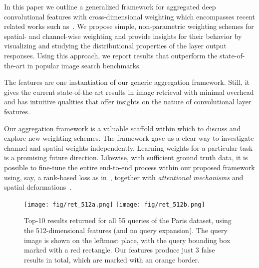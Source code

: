 \documentclass[runningheads]{llncs}
\begin{document}
In this paper we outline a generalized framework for aggregated deep convolutional features with cross-dimensional weighting which encompasses recent related works such as~\cite{BaLe15}. We propose simple, non-parametric weighting schemes for spatial- and channel-wise weighting and provide insights for their behavior by visualizing and studying the distributional properties of the layer output responses. Using this approach, we report results that outperform the state-of-the-art in popular image search benchmarks. 

The \Crow features are one instantiation of our generic aggregation framework. Still, it gives the current state-of-the-art results in image retrieval with minimal overhead and has intuitive qualities that offer insights on the nature of convolutional layer features.

Our aggregation framework is a valuable scaffold within which to discuss and explore new weighting schemes. The framework gave us a clear way to investigate channel and spatial weights independently. Learning weights for a particular task is a promising future direction. Likewise, with sufficient ground truth data, it is possible to fine-tune the entire end-to-end process within our proposed framework using, say, a rank-based loss as in~\cite{RaTC16, GARL16}, together with \textit{attentional mechanisms} and spatial deformations~\cite{JSZK15}. 




\begin{figure}[th!]
	\centering
		\texttt{[image: fig/ret\_512a.png]} 
		\texttt{[image: fig/ret\_512b.png]} 
        
\caption{Top-10 results returned for all 55 queries of the Paris dataset, using the 512-dimensional \Crow features (and no query expansion). The query image is shown on the leftmost place, with the query bounding box marked with a red rectangle. Our features produce just 3 false results in total, which are marked with an orange border.}
\label{fig:res}
\end{figure}
\clearpage 



\end{document}
